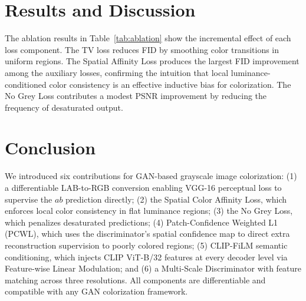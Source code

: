 \documentclass[conference]{IEEEtran}
\begin{document}
\section{Results and Discussion}


The ablation results in Table~\ref{tab:ablation} show the incremental effect of
each loss component. The TV loss reduces FID by smoothing color transitions in
uniform regions. The Spatial Affinity Loss produces the largest FID improvement
among the auxiliary losses, confirming the intuition that local
luminance-conditioned color consistency is an effective inductive bias for
colorization. The No Grey Loss contributes a modest PSNR improvement by reducing
the frequency of desaturated output.

\section{Conclusion}

We introduced six contributions for GAN-based grayscale image colorization:
(1) a differentiable LAB-to-RGB conversion enabling VGG-16 perceptual loss to
supervise the $ab$ prediction directly; (2) the Spatial Color Affinity Loss,
which enforces local color consistency in flat luminance regions; (3) the No Grey
Loss, which penalizes desaturated predictions; (4) Patch-Confidence Weighted L1
(PCWL), which uses the discriminator's spatial confidence map to direct extra
reconstruction supervision to poorly colored regions; (5) CLIP-FiLM semantic
conditioning, which injects CLIP ViT-B/32 features at every decoder level via
Feature-wise Linear Modulation; and (6) a Multi-Scale Discriminator with feature
matching across three resolutions. All components are differentiable and
compatible with any GAN colorization framework.


\printbibliography
\end{document}
